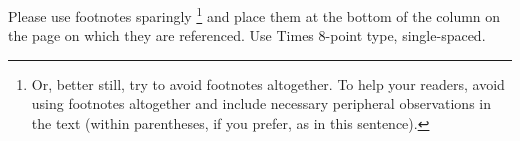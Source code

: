 \documentclass[times, 10pt,twocolumn]{article}
\begin{document}






Please use footnotes sparingly%
\footnote
   {%
     Or, better still, try to avoid footnotes altogether.  To help your 
     readers, avoid using footnotes altogether and include necessary 
     peripheral observations in the text (within parentheses, if you 
     prefer, as in this sentence).
   }
and place them at the bottom of the column on the page on which they are 
referenced. Use Times 8-point type, single-spaced.



\end{document}
